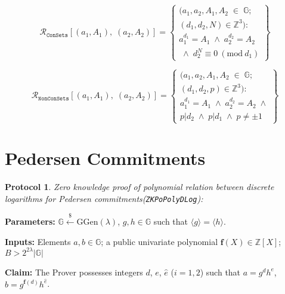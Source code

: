 \documentclass[11pt, lettersize, notitlepage, leqno, footskip=0.6cm]{article}
\newcommand{\bz}{\mathbb Z}
\newcommand{\ttt}{\texttt}
\newcommand{\bG}{\mathbb{G}}
\newcommand{\sett}{\ttt{Set}}
\newcommand{\la}{\langle}
\newcommand{\ra}{\rangle}
\newcommand{\mc}{\mathcal}
\newcommand{\mb}{\mathbb}
\newcommand{\mbf}{\mathbf}
\newcommand{\mr}{\mathrm}
\newcommand{\lam}{\lambda}
\newcommand{\lamb}{\lambda}
\newcommand{\what}{\widehat}
\newcommand{\sub}{\subseteq}
\newcommand{\mcM}{\mc{M}}
\newcommand{\noin}{\noindent}
\newcommand{\Mod}[1]{\ (\mathrm{mod}\ #1)}
\newtheorem{Prot}[Thm]{Protocol}
\numberwithin{equation}{section}
\begin{document}
{{{\begin{enumerate}[wide, labelwidth=!, labelindent=0pt]

\[
  \mc{R}_{\ttt{ConSets}}[(a_1, A_1),\;(a_2,A_2)] = \left\{\begin{array}{l}
    (a_1,a_2, A_1, A_2\;\in\;\mb{G}; \\
    (d_1, d_2, N) \in \bz^3):   \\
    a_1^{d_1} = A_1\;\wedge\;a_2^{d_2} = A_2\\
    \;\wedge\;d_2^{N}\equiv 0\Mod{d_1} 
  \end{array}\right\}
\]


\[
  \mc{R}_{\ttt{NonConSets}}[(a_1, A_1),\;(a_2,A_2)] = \left\{\begin{array}{l}
    (a_1,a_2, A_1, A_2\;\in\;\mb{G}; \\
    (d_1, d_2, p) \in \bz^3):   \\
    a_1^{d_1} = A_1\;\wedge\;a_2^{d_2} = A_2\;\wedge\\
   p \big| d_2\; \wedge\; p \big| d_1 \; \wedge\; p\neq \pm 1 
  \end{array}\right\}
\]


\end{enumerate}



\section{\fontsize{11}{11}\selectfont Pedersen Commitments}


\begin{Prot} \normalfont \hypertarget{Poly}{\textit{Zero knowledge proof of polynomial relation between discrete logarithms for Pedersen commitments}}(\verb|ZKPoPolyDLog|):\end{Prot} \vspace{-0.3cm}

\noin \textbf{Parameters:} $\mb{G}\xleftarrow{\$} \mr{GGen}(\lamb)$,  $g,h\in \mb{G}$ such that $\la g \ra = \la h \ra$.

\noin \textbf{Inputs:} Elements $a,b \in \mb{G}$; a public univariate polynomial $\mbf{f}(X)\in \bz[X]$; $B > 2^{2\lam}|\bG|$

\noin \textbf{Claim:} The Prover possesses integers $d$, $e$, $\what{e}$ ($i=1,2$) such that $a = g^dh^e$, $b = g^{\mbf{f}(d)}h^{\what{e}}$.

}}}
\end{document}
